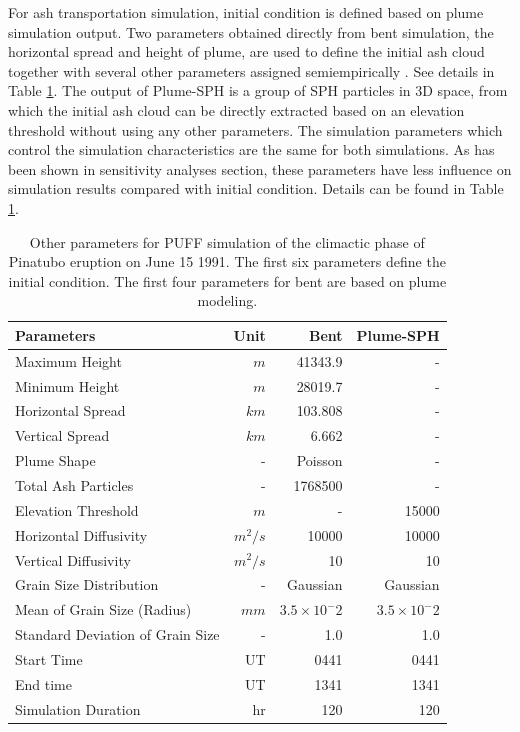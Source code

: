 For ash transportation simulation, initial condition is defined based on plume simulation output. Two parameters obtained directly from bent simulation, the horizontal spread and height of plume, are used to define the initial ash cloud together with several other parameters assigned semiempirically \citep{bursik2012estimation}. See details in Table \ref{tab:input_parameter_PUFF_simulation}. The output of Plume-SPH is a group of SPH particles in 3D space, from which the initial ash cloud can be directly extracted based on an elevation threshold without using any other parameters. The simulation parameters which control the simulation characteristics are the same for both simulations. As has been shown in sensitivity analyses section, these parameters have less influence on simulation results compared with initial condition. Details can be found in Table \ref{tab:input_parameter_PUFF_simulation}.

\begin{table}[htp]
\centering
      \caption{Other parameters for PUFF simulation of the climactic phase of Pinatubo eruption on June 15 1991. The first six parameters define the initial condition. The first four parameters for bent are based on plume modeling.}	
	  \begin{tabular}{lrrr}
	    \hline
	    Parameters    & Unit & Bent & Plume-SPH \\
	    \hline
	    Maximum Height & $m$ & 41343.9 & - \\
	    Minimum Height & $m$ & 28019.7 & - \\
	    Horizontal Spread & $km$ & 103.808 & -\\
	    Vertical Spread & $km$ & 6.662  & - \\
	    Plume Shape & - & Poisson & - \\
	    Total Ash Particles  & - & 1768500 & - \\
	    Elevation Threshold & $m$ & - &  15000 \\
	    Horizontal Diffusivity & $m^2/s$ &10000 & 10000\\
	    Vertical Diffusivity & $m^2/s$ & 10 & 10 \\
	    Grain Size Distribution & - & Gaussian & Gaussian  \\
	    Mean of Grain Size (Radius) & $mm$ & $3.5 \times 10 ^-2$ & $3.5 \times 10 ^-2$ \\
	    Standard Deviation of Grain Size & - &  1.0 & 1.0 \\
	    	Start Time & UT & 0441 & 0441 \\
	    End time & UT & 1341 & 1341 \\
	    Simulation Duration & hr & 120 & 120 \\
	    \hline
	  \end{tabular}
	  \label{tab:input_parameter_PUFF_simulation}
\end{table}

